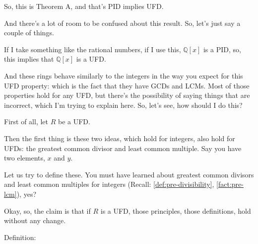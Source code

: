 \begin{speech}[01:15:54 - 01:18:14]
So, this is Theorem A, and that's PID implies UFD. 

And there's a lot of room to be confused about this result. So, let's just say a couple of things.

If I take something like the rational numbers, if I use this, $\mathbb{Q}[x]$ is a PID, so, this implies that $\mathbb{Q}[x]$ is a UFD. 

And these rings behave similarly to the integers in the way you expect for this UFD property: which is the fact that they have GCDs and LCMs. Most of those properties hold for any UFD, but there's the possibility of saying things that are incorrect, which I'm trying to explain here. So, let's see, how should I do this?

First of all, let $R$ be a UFD. 

Then the first thing is these two ideas, which hold for integers, also hold for UFDs: the greatest common divisor  and least common multiple.  Say you have two elements, $x$ and $y$. 

Let us try to define these. You must have learned about greatest common divisors and least common multiples for integers (Recall: \cref{def:pre-divisibility}, \cref{fact:pre-lcm}), yes?

Okay, so, the claim is that if $R$ is a UFD, those principles, those definitions, hold without any change.

Definition: 
\end{speech}


